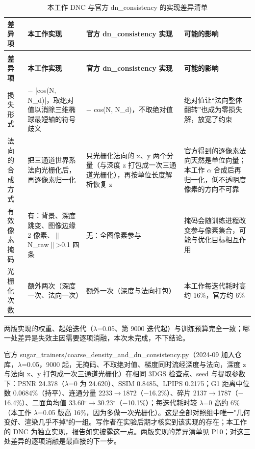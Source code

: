 \documentclass[UTF8,a4paper,11pt]{ctexart}
\begin{document}
{\small
\begin{longtable}{>{\raggedright\arraybackslash}p{1.48cm}>{\raggedright\arraybackslash}p{4.23cm}>{\raggedright\arraybackslash}p{4.23cm}>{\raggedright\arraybackslash}p{4.23cm}}
\caption{本工作 DNC 与官方 dn\_consistency 的实现差异清单}\label{tab:11}\\
\toprule
\textbf{差异项} & \textbf{本工作实现} & \textbf{官方 dn\_consistency 实现} & \textbf{可能的影响} \\
\midrule
\endfirsthead
\multicolumn{4}{l}{\footnotesize（续表 11）}\\
\toprule
\textbf{差异项} & \textbf{本工作实现} & \textbf{官方 dn\_consistency 实现} & \textbf{可能的影响} \\
\midrule
\endhead
\bottomrule
\endlastfoot
损失形式 & 1 $-$ |cos(N, N\_d)|，取绝对值以消除三维椭球最短轴的符号歧义 & 1 $-$ cos(N, N\_d)，不取绝对值 & 绝对值让“法向整体翻转”也成为零损失解，放宽了约束 \\
法向的合成方式 & 把三通道世界系法向光栅化后，再逐像素归一化 & 只光栅化法向的 x、y 两个分量（与深度 z 打包成一次三通道光栅化），再按单位长度解析恢复 z & 官方得到的逐像素法向天然是单位向量；本工作 $\alpha$ 合成后再归一化，低不透明度像素的方向不可靠 \\
有效像素掩码 & 有：背景、深度跳变、图像边缘 2 像素、$\|$N\_raw$\|$>0.1 四条 & 无：全图像素参与 & 掩码会随训练进程改变参与像素集合，可能与优化目标相互作用 \\
光栅化次数 & 额外两次（深度一次、法向一次） & 额外一次（深度与法向打包） & 本工作每迭代耗时高约 16\%，官方约 6\% \\
\end{longtable}
}
两版实现的权重、起始迭代（$\lambda$=0.05、第 9000 迭代起）与训练预算完全一致；哪一处差异是失效主因需要逐项消融，本次未完成，不下结论。

官方 sugar\_trainers/coarse\_density\_and\_dn\_consistency.py（2024-09 加入仓库，$\lambda$=0.05，9000 起，无掩码、不取绝对值、梯度同时流经深度与法向，深度 z 与法向 x、y 打包成一次三通道光栅化）在相同 3DGS 检查点、seed 与提取参数下：PSNR 24.378（$\lambda$=0 为 24.620）、SSIM 0.8485、LPIPS 0.2175；G1 距离中位数 0.0684\%（持平）、连通分量 2233$\rightarrow$1872（$-$16.2\%）、碎片 2137$\rightarrow$1787（$-$16.4\%）、二面角均值 33.60$^\circ$$\rightarrow$30.23$^\circ$（$-$10.1\%）；每迭代耗时较 $\lambda$=0 高约 6\%（本工作 $\lambda$=0.05 版高 16\%，因为多做一次光栅化）。这是全部对照组中唯一"几何变好、渲染几乎不掉"的一组。写作者在实验后期才核实到该实现的存在；本工作的 DNC 为独立实现，报告如实披露这一点。两版实现的差异清单见 P10；对这三处差异的逐项消融是最直接的下一步。
\end{document}
